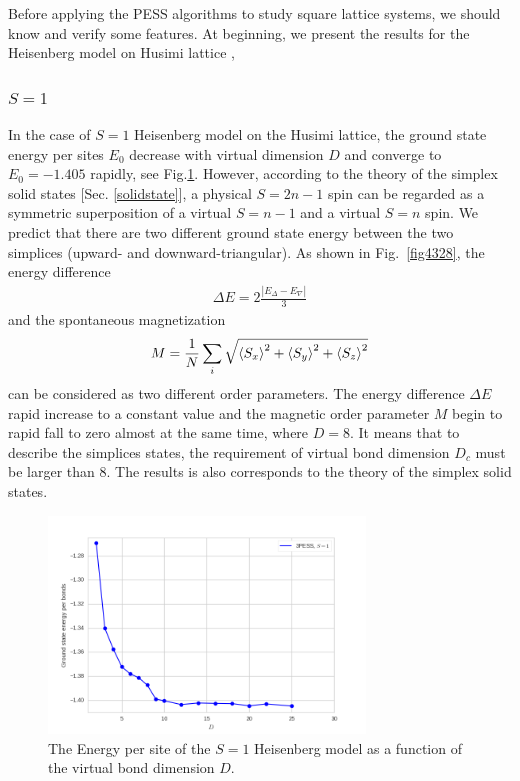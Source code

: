 Before applying the PESS algorithms to study square lattice systems, we should know and verify some features. At beginning, we present the results for the Heisenberg model on Husimi lattice \cite{Husimi1, Husimi2},

\subsubsection{$S=1$}

In the case of $S=1$ Heisenberg model on the Husimi lattice, the ground state energy per sites $E_0$ decrease with virtual dimension $D$ and converge to $E_0=-1.405$ rapidly, see Fig.\ref{fig4327}. However, according to the theory of the simplex solid states [Sec. \ref{solidstate}], a physical $S=2n-1$ spin can be regarded as a symmetric superposition of a virtual $S=n-1$ and a virtual $S=n$ spin. We predict that there are two different ground state energy between the two simplices (upward- and downward-triangular). As shown in Fig.~\ref{fig4328}, the energy difference
\begin{align}
	\Delta E = 2 \frac{|E_{\Delta}-E_{\nabla}|}{3}
\end{align}
and the spontaneous magnetization
\begin{align}
	M = \frac{1}{N} \sum_{i}{\sqrt{\braket{S_x}^2 + \braket{S_y}^2 + \braket{S_z}^2}}
\end{align}
can be considered as two different order parameters. The energy difference $\Delta E$ rapid increase to a constant value and the magnetic order parameter $M$ begin to rapid fall to zero almost at the same time, where $D=8$. It means that to describe the simplices states, the requirement of virtual bond dimension $D_c$ must be larger than $8$. The results is also corresponds to the theory of the simplex solid states.

\begin{figure}[H]
	\centering
	\includegraphics[width=0.75\textwidth]{figures/3pess_S1GE.png}
	\caption[The Energy per site of the $S=1$ Heisenberg model as a function of the virtual bond dimension $D$]{The Energy per site of the $S=1$ Heisenberg model as a function of the virtual bond dimension $D$.}
	\label{fig4327}
\end{figure}

